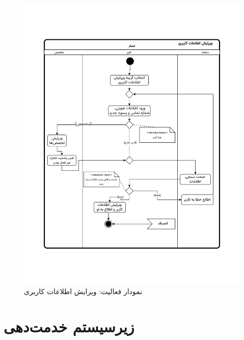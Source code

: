 \begin{figure}[ht!]
	\centering
	\includegraphics[scale=0.8, page=1]{figs/OOD-activity-edituser.pdf}
	\caption{نمودار فعالیت: ویرایش اطلاعات کاربری}
\end{figure}
\FloatBarrier
\newpage


\section{زیرسیستم خدمت‌دهی}


